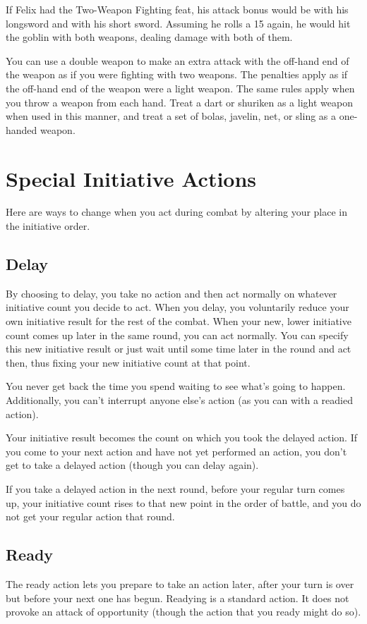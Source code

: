 \par If Felix had the Two-Weapon Fighting feat, his attack bonus would be  with his longsword and  with his short sword. Assuming he rolls a 15 again, he would hit the goblin with both weapons, dealing damage with both of them.

 You can use a double weapon to make an extra attack with the off-hand end of the weapon as if you were fighting with two weapons. The penalties apply as if the off-hand end of the weapon were a light weapon.
 The same rules apply when you throw a weapon from each hand. Treat a dart or shuriken as a light weapon when used in this manner, and treat a set of bolas, javelin, net, or sling as a one-handed weapon.

\section{Special Initiative Actions}
Here are ways to change when you act during combat by altering your place in the initiative order.

\subsection{Delay}
By choosing to delay, you take no action and then act normally on whatever initiative count you decide to act. When you delay, you voluntarily reduce your own initiative result for the rest of the combat. When your new, lower initiative count comes up later in the same round, you can act normally. You can specify this new initiative result or just wait until some time later in the round and act then, thus fixing your new initiative count at that point.

You never get back the time you spend waiting to see what's going to happen. Additionally, you can't interrupt anyone else's action (as you can with a readied action).

 Your initiative result becomes the count on which you took the delayed action. If you come to your next action and have not yet performed an action, you don't get to take a delayed action (though you can delay again).

If you take a delayed action in the next round, before your regular turn comes up, your initiative count rises to that new point in the order of battle, and you do not get your regular action that round.

\subsection{Ready}
The ready action lets you prepare to take an action later, after your turn is over but before your next one has begun. Readying is a standard action. It does not provoke an attack of opportunity (though the action that you ready might do so).

